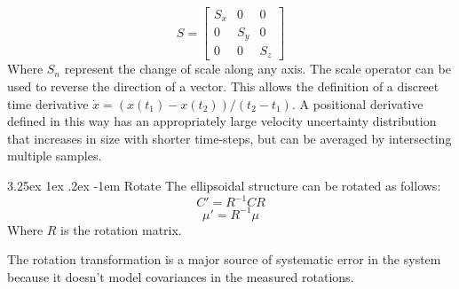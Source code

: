 \documentclass{article}
\makeatletter
\renewcommand\paragraph{\@startsection{paragraph}{5}{\z@}%
  {3.25ex \@plus1ex \@minus.2ex}%
  {-1em}%
  {\normalfont\normalsize\bfseries}}
\makeatother
\begin{document}
        \begin{equation}
        S=\begin{bmatrix}
          S_x & 0 & 0 \\[0.3em]
          0 & S_y & 0 \\[0.3em]
          0 & 0 & S_z
        \end{bmatrix}
        \end{equation}
        Where \(S_n\) represent the change of scale along any axis.
        The scale operator can be used to reverse the direction of a vector.  This allows the definition of a discreet time derivative \(\dot{x} = (x(t_1) - x(t_2))/(t_2-t_1)\).  A positional derivative defined in this way has an appropriately large velocity uncertainty distribution that increases in size with shorter time-steps, but can be averaged by intersecting multiple samples.

        \paragraph{Rotate}
        The ellipsoidal structure can be rotated as follows:
        \begin{equation}
        C' = R^{-1} C R
        \end{equation}
        \begin{equation}
        \mu' = R^{-1} \mu
        \end{equation}
        Where \(R\) is the rotation matrix.

        The rotation transformation is a major source of systematic error in the system because it doesn't model covariances in the measured rotations. %
\end{document}
